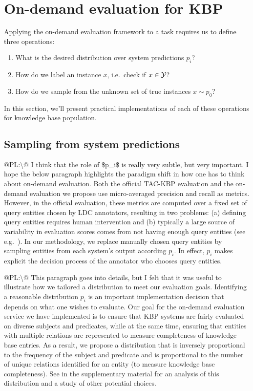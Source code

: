 \section{On-demand evaluation for KBP}
\label{sec:application}
Applying the on-demand evaluation framework to a task requires us to define three operations:
\begin{enumerate}
  \item What is the desired distribution over system predictions $p_i$?
  \item How do we label an instance $x$, i.e.\ check if $x \in \mathcal{Y}$?
  \item How do we sample from the unknown set of true instances $x \sim p_0$?
\end{enumerate}
In this section, we'll present practical implementations of each of these operations for knowledge base population.

\subsection{Sampling from system predictions}
\ac{@PL:\@ I think that the role of $p_i$ is really very subtle, but very important. I hope the below paragraph highlights the paradigm shift in how one has to think about on-demand evaluation.}
Both the official TAC-KBP evaluation and the on-demand evaluation we propose use micro-averaged precision and recall as metrics. However, in the official evaluation, these metrics are computed over a fixed set of query entities chosen by LDC annotators, resulting in two problems: (a) defining query entities requires human intervention and (b) typically a large source of variability in evaluation scores comes from not having enough query entities (see e.g.\ \citep{webber2010measurement}). In our methodology, we replace manually chosen query entities by sampling entities from each system’s output according $p_i$. In effect, $p_i$ makes explicit the decision process of the annotator who chooses query entities.

\ac{@PL:\@ This paragraph goes into details, but I felt that it was useful to illustrate how we tailored a distribution to meet our evaluation goals.}
Identifying a reasonable distribution $p_i$ is an important implementation decision that depends on what one wishes to evaluate.
Our goal for the on-demand evaluation service we have implemented is to ensure that KBP systems are fairly evaluated on diverse subjects and predicates, while at the same time, ensuring that entities with multiple relations are represented to measure completeness of knowledge base entries.
As a result, we propose a distribution that is inversely proportional to the frequency of the subject and predicate and is proportional to the number of unique relations identified for an entity (to measure knowledge base completeness).
See  in the supplementary material for an analysis of this distribution and a study of other potential choices.

